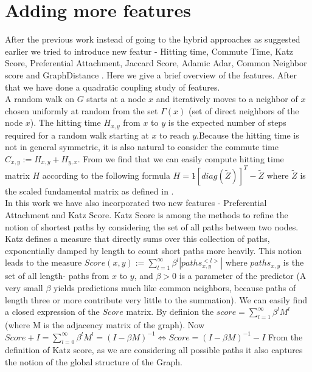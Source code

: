\section*{Adding more features}
After the previous work instead of going to the hybrid approaches as suggested earlier we tried to introduce new featur - Hitting time, Commute Time, Katz Score, Preferential Attachment, Jaccard Score, Adamic Adar, Common Neighbor score and GraphDistance \cite{linkpredsocial}. Here we give a brief overview of the features. After that we have done a quadratic coupling study of features.
\\
A random walk on $G$ starts at a node $x$ and iteratively moves to a neighbor of $x$ chosen uniformly at random from the set $\Gamma(x)$ (set of direct neighbors of the node $x$). The hitting time $H_{x,y}$ from $x$ to $y$ is the expected number of steps required for a random walk starting at $x$ to reach $y$.Because the hitting time is not in general symmetric, it is also natural to consider the commute time $C_{x,y} := H_{x,y} + H_{y,x}$. From \cite{hittingtime} we find that we can easily compute hitting time matrix $H$ according to the following formula $H = 1 \dot{}  [diag( \widetilde{Z})]^{T} - \widetilde{Z}$ where $\widetilde{Z}$ is the scaled fundamental matrix as defined in \cite{hittingtime}.
\\
In this work we have also incorporated two new features - Preferential Attachment and Katz Score. Katz Score is among the methods to refine the notion of shortest paths by considering the set of all paths between two nodes. Katz defines a measure that directly sums over this collection of paths, exponentially damped by length to count short paths more heavily. This notion leads to the measure $Score(x,y) := \sum\limits_{l=1}^{\infty} \beta^l |paths_{x,y}^{<l>}|$ where $paths_{x,y}$ is the set of all length- paths from $x$ to $y$, and $\beta > 0$ is a parameter of the predictor (A very small $\beta$ yields predictions much like common neighbors, because paths of length three or more contribute very little to the summation). We can easily find a closed expression of the $Score$ matrix. By definion the $score = \sum\limits_{l=1}^{\infty} \beta^l M^l$ (where M is the adjacency matrix of the graph). Now $Score + I = \sum\limits_{l=0}^{\infty} \beta^l M^l = (I-\beta M)^{-1} \iff Score = (I-\beta M)^{-1} - I$ From the definition of Katz score, as we are considering all possible paths it also captures the notion of the global structure of the Graph.
\\
